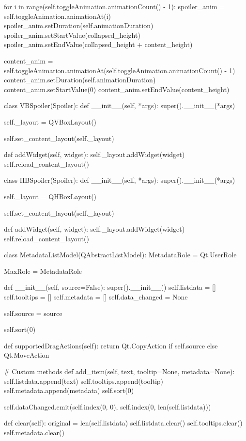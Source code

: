 \begin{pythoncode}
        for i in range(self.toggleAnimation.animationCount() - 1):
            spoiler_anim = self.toggleAnimation.animationAt(i)
            spoiler_anim.setDuration(self.animationDuration)
            spoiler_anim.setStartValue(collapsed_height)
            spoiler_anim.setEndValue(collapsed_height + content_height)

        content_anim = self.toggleAnimation.animationAt(self.toggleAnimation.animationCount() - 1)
        content_anim.setDuration(self.animationDuration)
        content_anim.setStartValue(0)
        content_anim.setEndValue(content_height)


class VBSpoiler(Spoiler):
    def __init__(self, *args):
        super().__init__(*args)

        self._layout = QVBoxLayout()

        self.set_content_layout(self._layout)

    def addWidget(self, widget):
        self._layout.addWidget(widget)
        self.reload_content_layout()


class HBSpoiler(Spoiler):
    def __init__(self, *args):
        super().__init__(*args)

        self._layout = QHBoxLayout()

        self.set_content_layout(self._layout)

    def addWidget(self, widget):
        self._layout.addWidget(widget)
        self.reload_content_layout()


class MetadataListModel(QAbstractListModel):
    MetadataRole = Qt.UserRole

    MaxRole = MetadataRole

    def __init__(self, source=False):
        super().__init__()
        self.listdata = []
        self.tooltips = []
        self.metadata = []
        self.data_changed = None

        self.source = source

        self.sort(0)
    
    def supportedDragActions(self):
        return Qt.CopyAction if self.source else Qt.MoveAction

    # Custom methods
    def add_item(self, text, tooltip=None, metadata=None):
        self.listdata.append(text)
        self.tooltips.append(tooltip)
        self.metadata.append(metadata)
        self.sort(0)

        self.dataChanged.emit(self.index(0, 0), self.index(0, len(self.listdata)))

    def clear(self):
        original = len(self.listdata)
        self.listdata.clear()
        self.tooltips.clear()
        self.metadata.clear()


\end{pythoncode}
